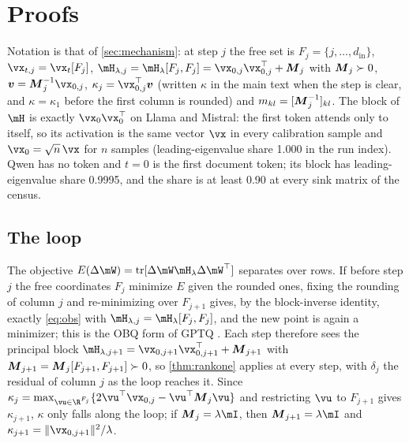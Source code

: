 \section{Proofs}
\label{app:proofs}
Notation is that of \cref{sec:mechanism}: at step $j$ the free set is $F_j=\{j,\dots,d_{\mathrm{in}}\}$, $\vx_{t,j}=\vx_t[F_j]$, $\hess_{\lambda,j}=\hess_\lambda[F_j,F_j]=\vx_{0,j}\vx_{0,j}^\top+\mM_j$ with $\boldsymbol{M}_j\succ0$, $\vv=\mM_j^{-1}\vx_{0,j}$, $\kappa_j=\vx_{0,j}^\top\vv$ (written $\kappa$ in the main text when the step is clear, and $\kappa=\kappa_1$ before the first column is rounded) and $m_{kl}=[\boldsymbol{M}_j^{-1}]_{kl}$.
The \bos{} block of $\hess$ is exactly $\vx_0\vx_0^\top$ on Llama and Mistral: the first token attends only to itself, so its activation is the same vector $\vx$ in every calibration sample and $\vx_0=\sqrt{n}\,\vx$ for $n$ samples (leading-eigenvalue share 1.000 in the run index). Qwen has no \bos{} token and $t=0$ is the first document token; its block has leading-eigenvalue share 0.9995, and the share is at least 0.90 at every sink matrix of the census.

\subsection{The loop}
\label{app:proofs:loop}
The objective $E(\Delta\mW)=\operatorname{tr}[\Delta\mW\hess_\lambda\Delta\mW^\top]$ separates over rows.
If before step $j$ the free coordinates $F_j$ minimize $E$ given the rounded ones, fixing the rounding of column $j$ and re-minimizing over $F_{j+1}$ gives, by the block-inverse identity, exactly \cref{eq:obs} with $\hess_{\lambda,j}=\hess_\lambda[F_j,F_j]$, and the new point is again a minimizer; this is the OBQ form of GPTQ \citep{frantar2022obc,frantar2023gptq}.
Each step therefore sees the principal block $\hess_{\lambda,j+1}=\vx_{0,j+1}\vx_{0,j+1}^\top+\mM_{j+1}$ with $\boldsymbol{M}_{j+1}=\boldsymbol{M}_j[F_{j+1},F_{j+1}]\succ0$, so \cref{thm:rankone} applies at every step, with $\delta_j$ the residual of column $j$ as the loop reaches it.
Since $\kappa_j=\max_{\vu\in\R^{F_j}}\{2\vu^\top\vx_{0,j}-\vu^\top\mM_j\vu\}$ and restricting $\vu$ to $F_{j+1}$ gives $\kappa_{j+1}$, $\kappa$ only falls along the loop; if $\mM_j=\lambda\mI$, then $\mM_{j+1}=\lambda\mI$ and $\kappa_{j+1}=\|\vx_{0,j+1}\|^2/\lambda$.

